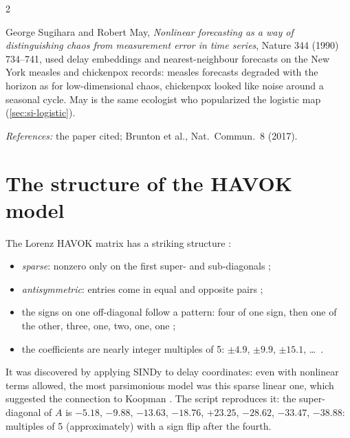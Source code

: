 \begin{paracol}{2}
\Needspace*{10.5cm}\begin{history}
George Sugihara and Robert May, \emph{Nonlinear forecasting as a way of distinguishing chaos from measurement error in time
series}, Nature 344 (1990) 734--741, used delay embeddings and nearest-neighbour forecasts on the New York measles and chickenpox
records: measles forecasts degraded with the horizon as for low-dimensional chaos, chickenpox looked like noise around a seasonal
cycle. May is the same ecologist who popularized the logistic map (\cref{sec:si-logistic}).\par
\textit{References:} the paper cited; Brunton et al., Nat.\ Commun.\ 8 (2017).
\end{history}

\section{The structure of the HAVOK model}\label{sec:hv-structure}

The Lorenz HAVOK matrix has a striking structure :
\begin{itemize}
  \item \emph{sparse}: nonzero only on the first super- and sub-diagonals ;
  \item \emph{antisymmetric}: entries come in equal and opposite pairs ;
  \item the signs on one off-diagonal follow a pattern: four of one sign, then one of the other, three, one, two, one, one
        ;
  \item the coefficients are nearly integer multiples of 5: $\pm4.9$, $\pm9.9$, $\pm15.1$, \dots\ .
\end{itemize}
It was discovered by applying SINDy to delay coordinates: even with nonlinear terms allowed, the most parsimonious model was this
sparse linear one, which suggested the connection to Koopman . The script
reproduces it: the super-diagonal of $A$ is $-5.18$, $-9.88$, $-13.63$, $-18.76$, $+23.25$, $-28.62$, $-33.47$, $-38.88$: multiples
of 5 (approximately) with a sign flip after the fourth.


\end{paracol}
